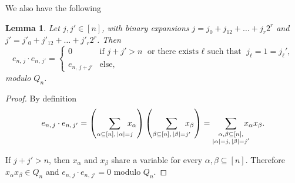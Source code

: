 \documentclass[11pt]{article}
\newcommand{\es}[2]{e_{#1,\, #2}}
\theoremstyle{plain}
\newtheorem{lem}[theo]{Lemma}
\theoremstyle{definition}
\theoremstyle{remark}
\begin{document}
We also have the following 
\begin{lem}\label{lem:belprodottoesp}
    Let $j,j'\in[n]$, with binary expansions $j = j_0 + j_12 + \dots + j_r2^r$ and $j' = j'_0 + j'_12 + \dots + j'_r2^r$. Then
    \begin{equation*}
        \es{n}{j}\cdot\es{n}{j'}=
        \begin{cases}
            0 & \text{if }j+j'>n\text{ or there exists $\ell$ such that }j_\ell=1=j_\ell',\\
            \es{n}{j+j'} & \text{else},
        \end{cases}
    \end{equation*}
modulo $Q_n$.
\end{lem}
\begin{proof}
    By definition 
    \begin{equation*}
        \es{n}{j}\cdot\es{n}{j'} =\left(\sum_{\alpha\subseteq[n],\,|\alpha|=j}\hspace{-0.3cm}x_\alpha\right)\left(\sum_{\beta\subseteq[n],\,|\beta|=j'}\hspace{-0.3cm}x_\beta\right)
        =\sum_{\substack{\alpha,\beta\subseteq[n],\\|\alpha|=j,\,|\beta|=j'}}\hspace{-0.3cm}x_\alpha x_\beta.
    \end{equation*}
    
    If $j+j'>n$, then $x_\alpha$ and $x_\beta$ share a variable for every $\alpha,\beta\subseteq [n]$. Therefore $x_\alpha x_\beta\in Q_n$ and $\es{n}{j}\cdot\es{n}{j'}=0$ modulo $Q_n$.


\end{proof}
\end{document}
